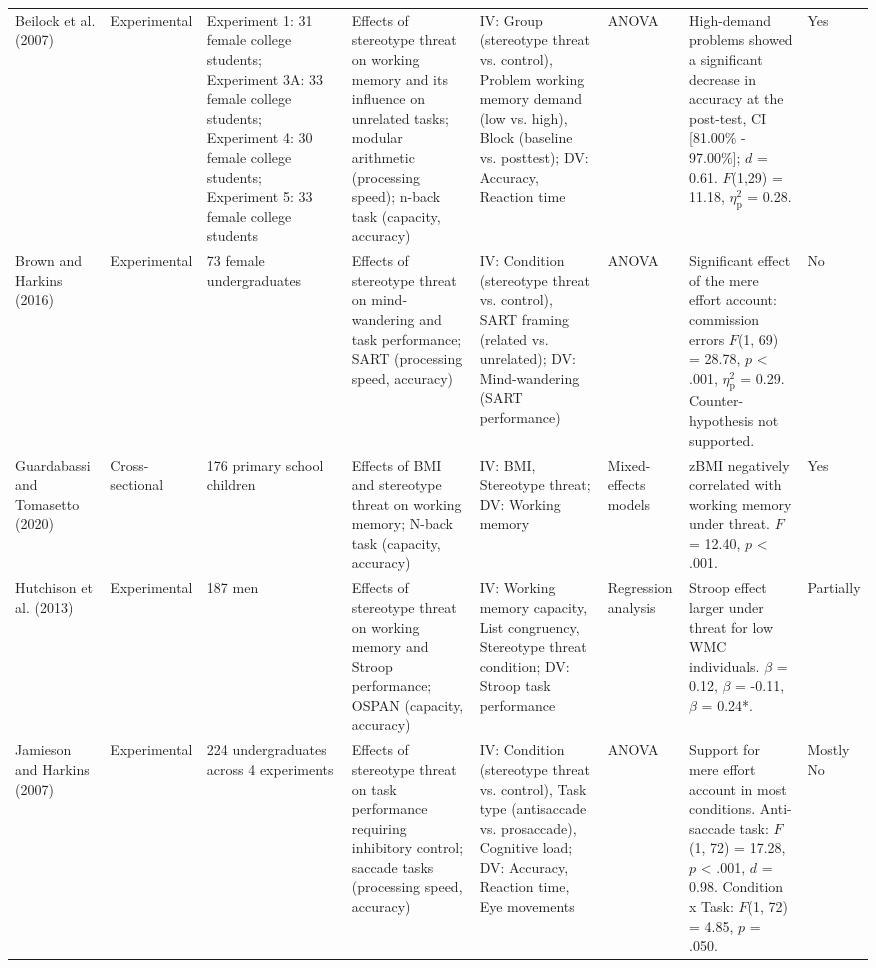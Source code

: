 \documentclass[
  stu, a4paper,floatsintext]{apa7}
\newenvironment{lltable}{\begin{landscape}\centering\begin{ThreePartTable}}{\end{ThreePartTable}\end{landscape}}
\begin{document}
\begin{lltable}
\begin{longtable}{p{1.8cm}p{2.6cm}p{2.5cm}p{3cm}p{3cm}p{3cm}p{3.5cm}p{1.5cm}}
Beilock et al. (2007) & Experimental & Experiment 1: 31 female college students; Experiment 3A: 33 female college students; Experiment 4: 30 female college students; Experiment 5: 33 female college students & Effects of stereotype threat on working memory and its influence on unrelated tasks; modular arithmetic (processing speed); n-back task (capacity, accuracy) & IV: Group (stereotype threat vs. control), Problem working memory demand (low vs. high), Block (baseline vs. posttest); DV: Accuracy, Reaction time & ANOVA & High-demand problems showed a significant decrease in accuracy at the post-test, CI [81.00\% - 97.00\%]; $\textit{d}$ = 0.61. $\textit{F}$(1,29) = 11.18, $\eta^{2}_\text{p}$ = 0.28. & Yes\\
Brown and Harkins (2016) & Experimental & 73 female undergraduates & Effects of stereotype threat on mind-wandering and task performance; SART (processing speed, accuracy) & IV: Condition (stereotype threat vs. control), SART framing (related vs. unrelated); DV: Mind-wandering (SART performance) & ANOVA & Significant effect of the mere effort account: commission errors $\textit{F}$(1, 69) = 28.78, $p$ < .001, $\eta^{2}_\text{p}$ = 0.29. Counter-hypothesis not supported. & No\\
Guardabassi and Tomasetto (2020) & Cross-sectional & 176 primary school children & Effects of BMI and stereotype threat on working memory; N-back task (capacity, accuracy) & IV: BMI, Stereotype threat; DV: Working memory & Mixed-effects models & zBMI negatively correlated with working memory under threat. $F$ = 12.40, $p$ < .001. & Yes\\
Hutchison et al. (2013) & Experimental & 187 men & Effects of stereotype threat on working memory and Stroop performance; OSPAN (capacity, accuracy) & IV: Working memory capacity, List congruency, Stereotype threat condition; DV: Stroop task performance & Regression analysis & Stroop effect larger under threat for low WMC individuals. $\beta$ = 0.12, $\beta$ = -0.11, $\beta$ = 0.24*. & Partially\\
Jamieson and Harkins (2007) & Experimental & 224 undergraduates across 4 experiments & Effects of stereotype threat on task performance requiring inhibitory control; saccade tasks (processing speed, accuracy) & IV: Condition (stereotype threat vs. control), Task type (antisaccade vs. prosaccade), Cognitive load; DV: Accuracy, Reaction time, Eye movements & ANOVA & Support for mere effort account in most conditions. Anti-saccade task: $F$(1, 72) = 17.28, $p$ < .001, $d$ = 0.98. Condition x Task: $F$(1, 72) = 4.85, $p$ = .050. & Mostly No\\

\end{longtable}
\end{lltable}
\end{document}
